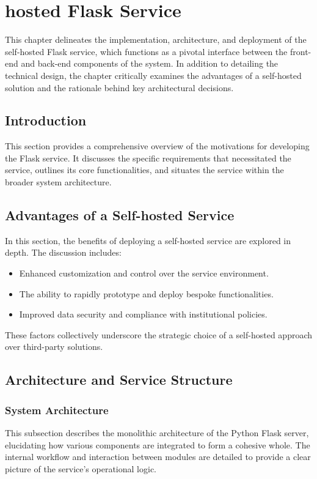 \chapter{hosted Flask Service}
\label{cha:hosted_flask_service}


This chapter delineates the implementation, architecture, and deployment of the self-hosted Flask service, 
which functions as a pivotal interface between the front-end and back-end components of the system. 
In addition to detailing the technical design, the chapter critically examines the advantages of a self-hosted solution 
and the rationale behind key architectural decisions.



\section{Introduction}
This section provides a comprehensive overview of the motivations for developing the Flask service. It discusses the specific requirements that necessitated the service, outlines its core functionalities, and situates the service within the broader system architecture.

\section{Advantages of a Self-hosted Service}
In this section, the benefits of deploying a self-hosted service are explored in depth. The discussion includes:
\begin{itemize}
    \item Enhanced customization and control over the service environment.
    \item The ability to rapidly prototype and deploy bespoke functionalities.
    \item Improved data security and compliance with institutional policies.
\end{itemize}
These factors collectively underscore the strategic choice of a self-hosted approach over third-party solutions.

\section{Architecture and Service Structure}
\subsection{System Architecture}
This subsection describes the monolithic architecture of the Python Flask server, elucidating how various components are integrated to form a cohesive whole. The internal workflow and interaction between modules are detailed to provide a clear picture of the service's operational logic.
